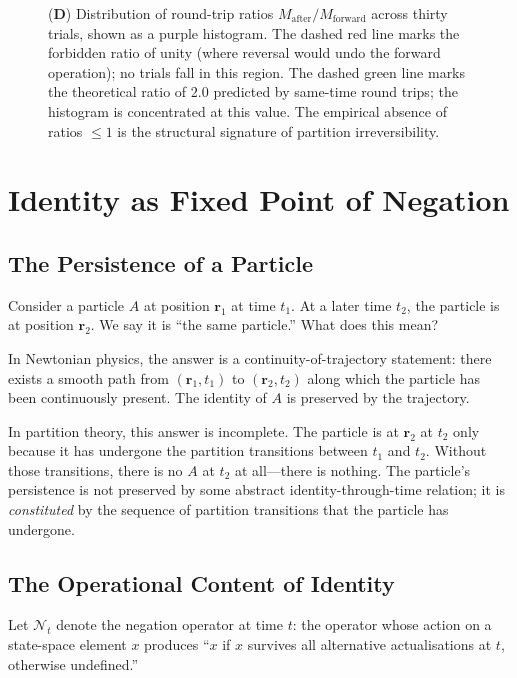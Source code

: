 \documentclass[twocolumn,10pt,a4paper]{article}
\theoremstyle{definition}
\theoremstyle{remark}
\newcommand{\Negation}{\mathcal{N}}
\begin{document}
\begin{figure}[!htbp]
{    (\textbf{D}) Distribution of round-trip ratios $M_{\mathrm{after}}/M_{\mathrm{forward}}$ across thirty trials, shown as a purple histogram. The dashed red line marks the forbidden ratio of unity (where reversal would undo the forward operation); no trials fall in this region. The dashed green line marks the theoretical ratio of $2.0$ predicted by same-time round trips; the histogram is concentrated at this value. The empirical absence of ratios $\leq 1$ is the structural signature of partition irreversibility.}
    \label{fig:panel-E3}
\end{figure}

\section{Identity as Fixed Point of Negation}
\label{sec:negation}

\subsection{The Persistence of a Particle}

Consider a particle $A$ at position $\mathbf{r}_1$ at time $t_1$. At a later time $t_2$, the particle is at position $\mathbf{r}_2$. We say it is ``the same particle.'' What does this mean?

In Newtonian physics, the answer is a continuity-of-trajectory statement: there exists a smooth path from $(\mathbf{r}_1, t_1)$ to $(\mathbf{r}_2, t_2)$ along which the particle has been continuously present. The identity of $A$ is preserved by the trajectory.

In partition theory, this answer is incomplete. The particle is at $\mathbf{r}_2$ at $t_2$ only because it has undergone the partition transitions between $t_1$ and $t_2$. Without those transitions, there is no $A$ at $t_2$ at all---there is nothing. The particle's persistence is not preserved by some abstract identity-through-time relation; it is \emph{constituted} by the sequence of partition transitions that the particle has undergone.

\subsection{The Operational Content of Identity}

Let $\Negation_t$ denote the negation operator at time $t$: the operator whose action on a state-space element $x$ produces ``$x$ if $x$ survives all alternative actualisations at $t$, otherwise undefined.''
\end{document}
